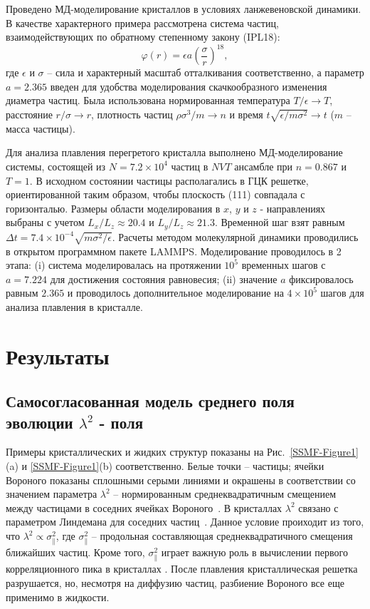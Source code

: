 Проведено МД-моделирование кристаллов в условиях ланжевеновской динамики.
В качестве характерного примера рассмотрена система частиц, взаимодействующих по обратному степенному закону (IPL18):
\begin{equation}
  \label{SSMF-eq3}
  \varphi(r) = \epsilon a \left(\frac{\sigma}{r}\right)^{18},
\end{equation}
где $\epsilon$ и $\sigma$ -- сила и характерный масштаб отталкивания соответственно,
а параметр $ a = 2.365 $ введен для удобства моделирования скачкообразного изменения диаметра частиц.
Была использована нормированная температура $ T/ \epsilon \rightarrow T $, расстояние $ r/ \sigma \rightarrow r $, плотность частиц $\rho\sigma^3/m\rightarrow n$ и время $t\sqrt{\epsilon/m\sigma^2} \rightarrow t$ ($m$ -- масса частицы).

Для анализа плавления перегретого кристалла выполнено МД-моделирование системы, состоящей из $ N = 7.2 \times 10 ^ 4 $ частиц в $NVT$ ансамбле при $n=0.867$ и $T=1$.
В исходном состоянии частицы располагались в ГЦК решетке, ориентированной таким образом, чтобы плоскость (111) совпадала с горизонталью.
Размеры области моделирования в $ x $, $ y $ и $ z $ - направлениях выбраны с учетом $ L_x / L_z \approx 20.4 $ и $ L_y / L_z \approx 21.3 $.
Временной шаг взят равным $ \Delta t = 7.4 \times 10 ^ {- 4} \sqrt {m \sigma ^ 2 / \epsilon}$.
Расчеты методом молекулярной динамики проводились в открытом программном пакете LAMMPS.
Моделирование проводилось в 2 этапа: (i) система моделировалась на протяжении $ 10 ^ 5 $ временных шагов с $ a = 7.224 $ для достижения состояния равновесия; (ii) значение $a$ фиксировалось равным $ 2.365 $ и проводилось дополнительное моделирование на $ 4 \times 10 ^ 5 $ шагов для анализа плавления в кристалле.

\section{Результаты}
\subsection{Самосогласованная модель среднего поля эволюции $\lambda^2$ - поля}

Примеры кристаллических и жидких структур показаны на Рис.~\ref{SSMF-Figure1}(a) и \ref{SSMF-Figure1}(b) соответственно.
Белые точки -- частицы; ячейки Вороного показаны сплошными серыми линиями и окрашены в соответствии со значением параметра $\lambda^2$ -- нормированным среднеквадратичным смещением между частицами в соседних ячейках Вороного~\cite{10.1021/acs.jpcc.7b09317}.
В кристаллах $\lambda^2$ связано с параметром Линдемана для соседних частиц~\cite{10.1016/0375-9601(85)90617-6}.
Данное условие проиходит из того, что $\lambda^2\propto \sigma_ \| ^ 2 $, где $ \sigma_ \| ^ 2 $ -- продольная составляющая среднеквадратичного смещения ближайших частиц.
Кроме того, $ \sigma_ \| ^ 2 $ играет важную роль в вычислении первого корреляционного пика в кристаллах \cite{10.1063/1.4869863, 10.1063/1.4926945, 10.1088/0953-8984/28/23/235401, 10.1039/c7sm02429k, 10.1063/1.5116176}.
После плавления кристаллическая решетка разрушается, но, несмотря на диффузию частиц, разбиение Вороного все еще применимо в жидкости.

